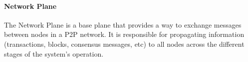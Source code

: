 \paragraph{Network Plane}
The Network Plane is a base plane that provides a way to exchange messages between nodes in a \gls{P2P} network. It is responsible for propagating information (transactions, blocks, consensus messages, etc) to all nodes across the different stages of the system's operation.
















